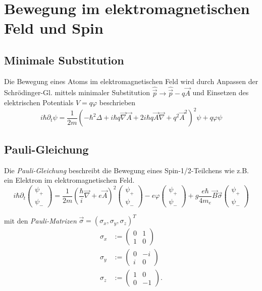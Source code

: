 \documentclass{article}
\newcommand{\lr}[1]{\left(#1\right)}
\begin{document}
\newpage


\section{Bewegung im elektromagnetischen Feld und Spin}
\subsection{Minimale Substitution}
Die Bewegung eines Atoms im elektromagnetischen Feld wird durch Anpassen der Schrödinger-Gl. mittels minimaler Substitution $\hat{\vec{p}} \to \hat{\vec{p}} - q\vec{A}$ und Einsetzen des elektrischen Potentials $V = q\varphi$ beschrieben
	\begin{equation}
		i\hbar \partial_t \psi = \frac{1}{2m} \lr{ -\hbar^2\Delta + i\hbar q \vec{\nabla}\vec{A} + 2 i\hbar q \vec{A}\vec{\nabla} + q^2\vec{A}^2 }^2 \psi + q\varphi \psi
	\end{equation}


\subsection{Pauli-Gleichung}
Die \textit{Pauli-Gleichung} beschreibt die Bewegung eines Spin-1/2-Teilchens wie z.B. ein Elektron im elektromagnetischen Feld.
	\begin{equation}
		i\hbar\partial_t
		\begin{pmatrix}
			\psi_+ \\ \psi_-
		\end{pmatrix}
		= \frac{1}{2m} \lr{ \frac{\hbar}{i}\vec{\nabla} + e\vec{A} }^2
		\begin{pmatrix}
			\psi_+ \\ \psi_-
		\end{pmatrix}
		- e\varphi
		\begin{pmatrix}
			\psi_+ \\ \psi_-
		\end{pmatrix}
		+ g \frac{e\hbar}{4m_e} \vec{B} \vec{\sigma}
		\begin{pmatrix}
			\psi_+ \\ \psi_-
		\end{pmatrix}
	\end{equation}

mit den \textit{Pauli-Matrizen} $\vec{\sigma} = (\sigma_x, \sigma_y, \sigma_z)^T$
	\begin{align*}
		\sigma_x &:=
		\begin{pmatrix}
			0 & 1 \\ 1 & 0
		\end{pmatrix} \\
		\sigma_y &:=
		\begin{pmatrix}
			0 & -i \\ i & 0
		\end{pmatrix} \\
		\sigma_z &:=
		\begin{pmatrix}
			1 & 0 \\ 0 & -1
		\end{pmatrix}.
	\end{align*}		
\end{document}
